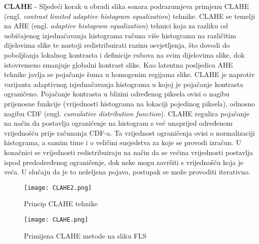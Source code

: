\documentclass[times, utf8, diplomski]{fer}
\begin{document}
\textbf{CLAHE} - Sljedeći korak u obradi slika sonara podrazumjeva primjenu CLAHE (engl. \textit{contrast limited adaptive histogram equalization}) tehnike. CLAHE se temelji na AHE (engl. \textit{adaptive histogram equalization}) tehnici koja za razliku od uobičajenog izjednačavanja histograma računa više histograma na različitim dijelovima slike te nastoji redistribuirati razinu osvjetljenja, što dovodi do poboljšanja lokalnog kontrasta i definicije rubova na svim dijelovima slike, dok istovremeno smanjuje globalni kontrast slike. Kao latentna posljedica AHE tehnike javlja se pojačanje šuma u homogenim regijama slike. CLAHE je naprotiv varijanta adaptivnog izjednačavanja histograma u kojoj je pojačanje kontrasta ograničeno. Pojačanje kontrasta u blizini određenog piksela ovisi o nagibu prijenosne funkcije (vrijednosti histograma na lokaciji pojedinog piksela), odnosno nagibu CDF (engl. \textit{cumulative distribution function}). CLAHE regulira pojačanje na način da postavlja ograničenje na histogram s već unaprijed određenom vrijednošću prije računanja CDF-a. Ta vrijednost ograničenja ovisi o normalizaciji histograma, a samim time i o veličini susjedstva za koje se provodi izračun. U konačnici se vrijednosti redistribuiraju na način da se većina vrijednosti postavlja ispod predodređenog ograničenje, dok neke mogu završiti s vrijednošću koja je veća. U slučaju da je to neželjena pojava, postupak se može provoditi iterativno.
\begin{figure}[htb]
\centering
\texttt{[image: CLAHE2.png]}
\caption{Princip CLAHE tehnike}
\label{fig:Pred-obrada slika sonara}
\end{figure}

\begin{figure}[htb]
\centering
\texttt{[image: CLAHE.png]}
\caption{Primijena CLAHE metode na sliku FLS}
\label{fig:Pred-obrada slika sonara}
\end{figure}
\newpage
\end{document}
